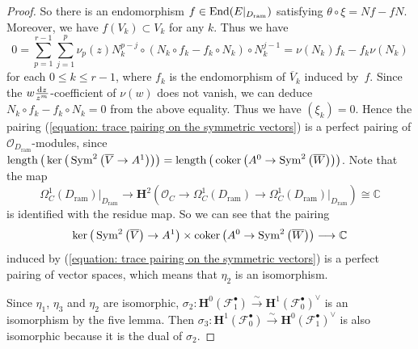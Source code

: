 \documentclass[pdftex]{sigma}
\numberwithin{equation}{section}
\newcommand\coker{\mathop{\rm coker}\nolimits}
\newcommand\End{\mathop{\rm End}\nolimits}
\newcommand{\length}{\mathop{\rm length}\nolimits}
\newcommand{\Sym}{\mathop{\rm Sym}\nolimits}
\begin{document}
\begin{proof}
So there is an endomorphism $f\in \End(E|_{D_{\mathrm{ram}}})$
satisfying $\theta\circ\xi=Nf-fN$.
Moreover, we have $f(V_k)\subset V_k$ for any $k$.
Thus we have
\[
 0=\sum_{p=1}^{r-1}\sum_{j=1}^p \nu_p(z) N_k^{p-j}\circ
 (N_k\circ f_k-f_k\circ N_k)\circ N_k^{j-1}
 =\nu(N_k)f_k-f_k\nu(N_k)
\]
for each $0\leq k\leq r-1$, where $f_k$ is the endomorphism of $\overline{V}_k$
induced by~$f$.
Since the $w\frac{{\rm d}z}{z^m}$-coefficient of $\nu(w)$ does not vanish, we can deduce
$N_k\circ f_k-f_k\circ N_k=0$ from the above equality.
Thus we have $(\xi_k)=0$.
Hence the pairing
(\ref{equation: trace pairing on the symmetric vectors}) is a perfect pairing
of ${\mathcal O}_{D_{\mathrm{ram}}}$-modules, since
$\length \big( \ker\big(\Sym^2\big(\overline{V}\to A^1\big) \big)\big)
=\length \big( \coker \big(A^0\to\Sym^2\big(\overline{W}\big)\big)\big)$.
Note that the map
\[
 \Omega^1_C(D_{\mathrm{ram}})|_{D_{\mathrm{ram}}}
 \longrightarrow
 \mathbf{H}^2({\mathcal O}_C\rightarrow\Omega^1_C(D_{\mathrm{ram}})\to
 \Omega^1_C(D_{\mathrm{ram}})|_{D_{\mathrm{ram}}})\cong\mathbb{C}
\]
is identified with the residue map.
So we can see that the pairing
\[
 \ker\big(\Sym^2\big(\overline{V}\big)\rightarrow A^1\big)\times \coker \big(A^0\rightarrow \Sym^2\big(\overline{W}\big)\big)
 \longrightarrow \mathbb{C}
\]
induced by (\ref{equation: trace pairing on the symmetric vectors}) is a perfect pairing
of vector spaces, which means that
$\eta_2$ is an isomorphism.

Since $\eta_1$, $\eta_3$ and $\eta_2$ are isomorphic,
$\sigma_2\colon \mathbf{H}^0({\mathcal F}_1^{\bullet})
\xrightarrow{\sim} \mathbf{H}^1({\mathcal F}_0^{\bullet})^{\vee}$
is an isomorphism by the five lemma.
Then
$\sigma_3\colon
\mathbf{H}^1({\mathcal F}_0^{\bullet})\xrightarrow{\sim} \mathbf{H}^0({\mathcal F}_1^{\bullet})^{\vee}$
is also isomorphic because it is the dual of $\sigma_2$.


\end{proof}
\end{document}
